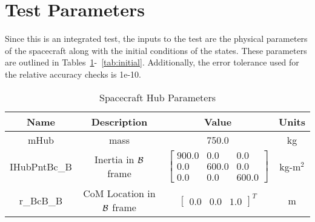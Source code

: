 \section{Test Parameters}

Since this is an integrated test, the inputs to the test are the physical parameters of the spacecraft along with the initial conditions of the states. These parameters are outlined in Tables~\ref{tab:hub}-~\ref{tab:initial}. Additionally, the error tolerance used for the relative accuracy checks is 1e-10.

\begin{table}[htbp]
	\caption{Spacecraft Hub Parameters}
	\label{tab:hub}
	\centering \fontsize{10}{10}\selectfont
	\begin{tabular}{| c | c | c | c |} %
		\hline
		\textbf{Name}  & \textbf{Description}  & \textbf{Value} & \textbf{Units} \\
		\hline
		mHub  & mass & 750.0 & kg \\
		\hline
		IHubPntBc\_B & Inertia in $\cal{B}$ frame & $\begin{bmatrix}
		900.0 & 0.0 & 0.0\\
		0.0 & 600.0 & 0.0\\
		0.0 & 0.0 & 600.0
		\end{bmatrix}$ & kg-m$^2$ \\
		\hline
		r\_BcB\_B & CoM Location in $\cal{B}$ frame & $\begin{bmatrix}
		0.0 & 0.0 & 1.0 \end{bmatrix}^T$ & m \\
		\hline
	\end{tabular}
\end{table}


